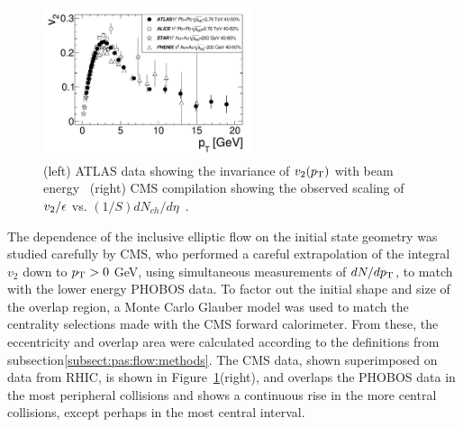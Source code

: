 \begin{figure}[!tb]
\begin{center}
\includegraphics[width=0.55\textwidth]{flowcorrelations_figs/atlas_v2_fig_06.pdf}
\caption[]{(left) ATLAS data showing the invariance of $\mbox{$v_2$}( \mbox{$p_{\mathrm{T}}$} )$
  with beam energy~\cite{ATLAS:2011ah} (right) CMS compilation showing
  the observed scaling of $\mbox{$v_2$} /\epsilon$ vs. $(1/S)
  dN_{ch}/d\eta$~\cite{Chatrchyan:2012ta}.}
\label{fig:pas:fc:scaling}
\end{center}
\end{figure}
The dependence of the inclusive elliptic flow on the initial state geometry was studied carefully by CMS, who 
performed a careful extrapolation of the integral $v_2$ down to $\mbox{$p_{\mathrm{T}}$}>0$ GeV, using simultaneous measurements of
$dN/d\mbox{$p_{\mathrm{T}}$}$, to match with the lower energy PHOBOS data.
To factor out the initial shape and size of the overlap region, a Monte Carlo Glauber model was used to match
the centrality selections made with the CMS forward calorimeter.  
From these, the eccentricity and overlap area were calculated according to the definitions from 
subsection\ref{subsect:pas:flow:methods}.  The CMS data, shown superimposed on data from RHIC, is shown in 
Figure~\ref{fig:pas:fc:scaling}(right), and overlaps the PHOBOS data in the most peripheral collisions and
shows a continuous rise in the more central collisions, except perhaps in the most central interval.


